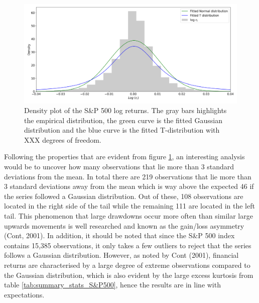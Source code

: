\begin{figure}[H] 
    \centering
    \includegraphics[width=1\textwidth]{analysis/data_description/images/SP500_distribution.png}
    \caption{Density plot of the S\&P 500 log returns. The gray bars highlights the empirical distribution, the green curve is the fitted Gaussian distribution and the blue curve is the fitted T-distribution with XXX degrees of freedom.}
    \label{fig: Kernel_distributions}
\end{figure}

Following the properties that are evident from figure \ref{fig: Kernel_distributions}, an interesting analysis would be to uncover how many observations that lie more than 3 standard deviations from the mean. In total there are 219 observations that lie more than 3 standard deviations away from the mean which is way above the expected 46 if the series followed a Gaussian distribution. Out of these, 108 observations are located in the right side of the tail while the remaining 111 are located in the left tail. This phenomenon that large drawdowns occur more often than similar large upwards movements is well researched and known as the gain/loss asymmetry (Cont, 2001). In addition, it should be noted that since the S\&P 500 index contains 15,385 observations, it only takes a few outliers to reject that the series follows a Gaussian distribution. However, as noted by Cont (2001), financial returns are characterised by a large degree of extreme observations compared to the Gaussian distribution, which is also evident by the large excess kurtosis from table \ref{tab:summary_stats_S&P500}, hence the results are in line with expectations.

